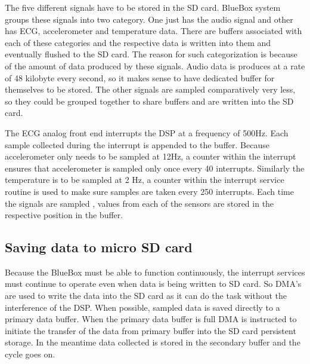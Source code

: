 The five different signals have to be stored in the SD card. BlueBox system groups these signals into two category. One just has the audio signal and other has ECG, accelerometer and temperature data. There are buffers associated with each of these categories and the respective data is written into them and eventually flushed to the SD card. The reason for such categorization is because of the amount of data produced by these signals. Audio data is produces at a rate of 48 kilobyte every second, so it makes sense to have dedicated buffer for themselves to be stored. The other signals are sampled comparatively very less, so they could be grouped together to share buffers and are written into the SD card. 

The ECG analog front end interrupts the DSP at a frequency of 500Hz. Each sample collected during the interrupt is appended to the buffer. Because accelerometer only needs to be sampled at 12Hz, a counter within the interrupt ensures that accelerometer is sampled only once every 40 interrupts. Similarly the temperature is to be sampled at 2 Hz, a counter within the interrupt service routine is used to make sure samples are taken every 250 interrupts. Each time the signals are sampled , values from each of the sensors are stored in the respective position in the buffer. 
\subsection{Saving data to micro SD card}

Because the BlueBox must be able to function continuously, the interrupt services must continue to operate even when data is being written to SD card. So DMA's are used to write the data into the SD card as it can do the task without the interference of the DSP. When possible, sampled data is saved directly to a primary data buffer. When the primary data buffer is full DMA is instructed to initiate the transfer of the data from primary buffer into the SD card persistent storage. In the meantime data collected is stored in the secondary buffer and the cycle goes on. 

